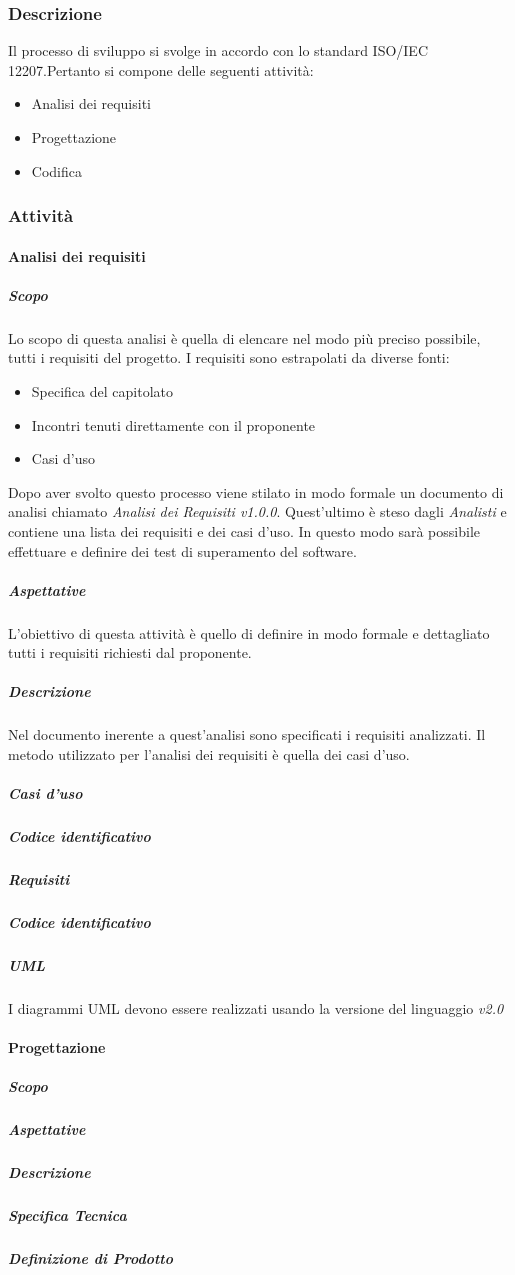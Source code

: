 	\subsubsection{Descrizione}
	Il processo di sviluppo si svolge in accordo con lo standard ISO/IEC 12207.Pertanto si compone delle seguenti attività:
	\begin{itemize}
		\item Analisi dei requisiti
		\item Progettazione
		\item Codifica
	\end{itemize}
	
	\subsubsection{Attività}
		\paragraph{Analisi dei requisiti}
			\subparagraph{Scopo}
			Lo scopo di questa analisi è quella di elencare nel modo più preciso possibile, tutti i requisiti del progetto. 
			I requisiti sono estrapolati da diverse fonti:
				\begin{itemize}
				\item Specifica del capitolato 
				\item Incontri tenuti direttamente con il proponente
				\item Casi d'uso
			\end{itemize}
		    Dopo aver svolto questo processo viene stilato in modo formale un documento di analisi chiamato \textit{Analisi dei Requisiti v1.0.0}.
		    Quest'ultimo è steso dagli \emph{Analisti} e contiene una lista dei requisiti e dei casi d'uso.
		    In questo modo sarà possibile effettuare e definire dei test di superamento del software. 
			\subparagraph{Aspettative}
			L'obiettivo di questa attività è quello di definire in modo formale e dettagliato tutti i requisiti richiesti dal proponente.
			\subparagraph{Descrizione}
			Nel documento inerente a quest'analisi sono specificati i requisiti analizzati.
			Il metodo utilizzato per l'analisi dei requisiti è quella dei casi d'uso.
			\subparagraph{Casi d'uso}
			\subparagraph{Codice identificativo}
			\subparagraph{Requisiti}
			\subparagraph{Codice identificativo}
			\subparagraph{UML}
			I diagrammi UML devono essere realizzati usando la versione del linguaggio \textit{v2.0}
		\paragraph{Progettazione}
			\subparagraph{Scopo}
			\subparagraph{Aspettative}
			\subparagraph{Descrizione}
			\subparagraph{Specifica Tecnica}
			\subparagraph{Definizione di Prodotto}
